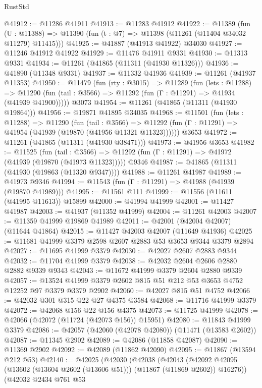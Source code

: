 \begin{lexlean}{RustStd}
\begin{coremodule}
@41912 := @11286 @41911
@41913 := @11283 @41912
@41922 := @11389
    (fun (U : @11388) => @11390 (fun (t : @7) => @11398 (@11261 (@11404 @34032 @11279) @11415)))
@41925 := @41887 (@41913 @41922) @34030
@41927 := @11246 @41912 @41922
@41929 := @11476 @41911 @9331
@41930 := @11313 @9331
@41934 := @11261 (@41865 (@11311 (@41930 @11326)))
@41936 := @41890 (@11348 @9331)
@41937 := @11332 @41936
@41939 := @11261 (@41937 @11353)
@41950 := @11479
    (fun (rty : @3015) =>
    @11289
      (fun (lets : @11288) =>
      @11290 (fun (tail : @3566) => @11292 (fun (Γ : @11291) => @41934 (@41939 @41900)))))
    @3073
@41954 := @11261 (@41865 (@11311 (@41930 @19864)))
@41956 := @19871 @41895 @34035
@41968 := @11501
    (fun (lets : @11288) =>
    @11290
      (fun (tail : @3566) =>
      @11292 (fun (Γ : @11291) => @41954 (@41939 (@19870 (@41956 @11321 @11323))))))
    @3653
@41972 := @11261 (@41865 (@11311 (@41930 @38471)))
@41973 := @41956 @3653
@41982 := @11525
    (fun (tail : @3566) => @11292 (fun (Γ : @11291) => @41972 (@41939 (@19870 (@41973 @11323)))))
    @9346
@41987 := @41865 (@11311 (@41930 (@19863 (@11320 @9347))))
@41988 := @11261 @41987
@41989 := @41973 @9346
@41994 := @11543 (fun (Γ : @11291) => @41988 (@41939 (@19870 @41989)))
@41995 := @11561 @111
@41999 := @11556 (@11611 (@41995 @11613)) @15899
@42000 := @41994 @41999
@42001 := @11427 @41987
@42003 := @41937 (@11352 @41999)
@42004 := @11261 @42003
@42007 := @11359 @41999 @19869 @41989
@42011 := @42001 (@42004 @42007) (@11644 @41864)
@42015 := @11427 @42003 @42007 (@11649 @41936)
@42025 := @11681 @41999 @3379 @2598 @2607 @2883 @53 @3653 @9344 @3379 @2894
@42027 := @11695 @41999 @3379
@42030 := @42027 @2607 @2883 @9344
@42032 := @11704 @41999 @3379
@42038 := @42032 @2604 @2606 @2880 @2882 @9339 @9343
@42043 := @11672 @41999 @3379 @2604 @2880 @9339
@42057 := @13524 @41999 @3379 @2602 @815 @51 @212 @53 @3653 @4752 @12252 @97 @3379 @3379 @2902
@42060 := @42027 @815 @51 @4752
@42066 := @42032 @301 @315 @22 @27 @4375 @3584
@42068 := @11716 @41999 @3379
@42072 := @42068 @156 @22 @156 @4375
@42073 := @11725 @41999
@42078 := @42066 (@42072 (@11724 (@42073 @156)) @15951)
@42080 := @11843 @41999 @3379
@42086 := @42057 (@42060 (@42078 @42080)) (@11471 (@13583 @2602))
@42087 := @11345 @2902
@42089 := @42086 (@11858 @42087)
@42090 := @11369 @2902
@42092 := @42089 (@11862 @42090)
@42095 := @11867 (@13594 @212 @53)
@42140 := @42025
    (@42030
      (@42038
        (@42043 (@42092 @42095 (@13602 (@13604 @2602 (@13606 @51))) (@11867 (@11869 @2602)) @16276))
        (@42032
          @2434
          @761
          @53

\end{coremodule}
\end{lexlean}
